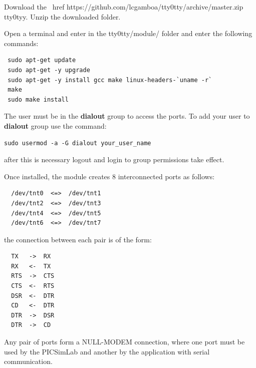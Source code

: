 Download the \ href {https://github.com/lcgamboa/tty0tty/archive/master.zip} {tty0tyy}.
Unzip the downloaded folder.
 
Open a terminal and enter in the tty0tty/module/ folder and enter the following commands:
\begin{verbatim}
 sudo apt-get update
 sudo apt-get -y upgrade
 sudo apt-get -y install gcc make linux-headers-`uname -r` 
 make
 sudo make install 
\end{verbatim}

The user must be in the \textbf{dialout} group to access the ports. 
To add your user to \textbf{dialout} group use the command:
\begin{verbatim}
sudo usermod -a -G dialout your_user_name
\end{verbatim}
after this is necessary logout and login to group permissions take effect.


Once installed, the module creates 8 interconnected ports as follows:
\begin{verbatim}
  /dev/tnt0  <=>  /dev/tnt1 
  /dev/tnt2  <=>  /dev/tnt3 
  /dev/tnt4  <=>  /dev/tnt5 
  /dev/tnt6  <=>  /dev/tnt7 
\end{verbatim}

the connection between each pair is of the form:
\begin{verbatim}  
  TX   ->  RX
  RX   <-  TX 	
  RTS  ->  CTS
  CTS  <-  RTS
  DSR  <-  DTR
  CD   <-  DTR
  DTR  ->  DSR
  DTR  ->  CD
\end{verbatim}

Any pair of ports form a NULL-MODEM connection, where one port must be used by the PICSimLab and another by the application with serial communication.
